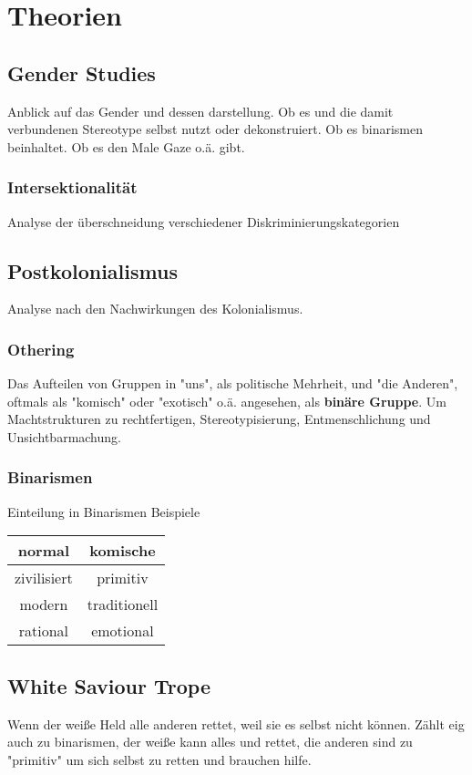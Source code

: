 \documentclass{article}
\begin{document}
 
\section{Theorien}
\subsection{Gender Studies}
Anblick auf das Gender und dessen darstellung. Ob es und die damit verbundenen Stereotype selbst nutzt oder dekonstruiert. Ob es binarismen beinhaltet. Ob es den Male Gaze o.ä. gibt.
\subsubsection{Intersektionalität}
Analyse der überschneidung verschiedener Diskriminierungskategorien
 
\subsection{Postkolonialismus}
Analyse nach den Nachwirkungen des Kolonialismus.
\subsubsection{Othering}
Das Aufteilen von Gruppen in "uns", als politische Mehrheit, und "die Anderen", oftmals als "komisch" oder "exotisch" o.ä. angesehen, als \textbf{binäre Gruppe}. Um Machtstrukturen zu rechtfertigen, Stereotypisierung, Entmenschlichung und Unsichtbarmachung.
 
\subsubsection{Binarismen}
Einteilung in Binarismen \newline
Beispiele 
\begin{center}
\begin{tabular}{ |c|c| }
\hline
 normal & komische \\
\hline
 zivilisiert & primitiv \\
\hline 
 modern & traditionell \\
\hline
 rational & emotional \\
\hline
\end{tabular}
\end{center}
  
\subsection{White Saviour Trope}
Wenn der weiße Held alle anderen rettet, weil sie es selbst nicht können. Zählt eig auch zu binarismen, der weiße kann alles und rettet, die anderen sind zu "primitiv" um sich selbst zu retten und brauchen hilfe.
 
\end{document}
